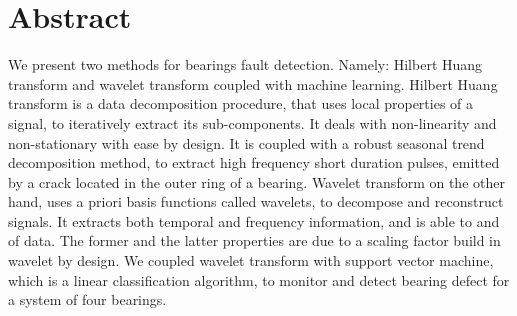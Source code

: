 \documentclass[../Main/thesis.tex]{subfiles}
\begin{document}
\null\vfill
{}
\chapter*{Abstract}
We present two methods for bearings fault detection. Namely: Hilbert Huang transform and wavelet transform coupled with machine learning. Hilbert Huang transform is a data decomposition procedure, that uses local properties of a signal, to iteratively extract its sub-components. It deals with non-linearity and non-stationary with ease by design. It is coupled with a robust seasonal trend decomposition method, to extract high frequency short duration pulses, emitted by a crack located in the outer ring of a bearing. Wavelet transform on the other hand, uses a priori basis functions called wavelets, to decompose and reconstruct signals. It extracts both temporal and frequency information, and is able to  and  of data. The former and the latter properties are due to a scaling factor build in wavelet by design.
We coupled wavelet transform with support vector machine, which is a linear classification algorithm, to monitor and detect bearing defect for a system of four bearings.

\vfill\vfill
\clearpage
\blankpage
\end{document}
